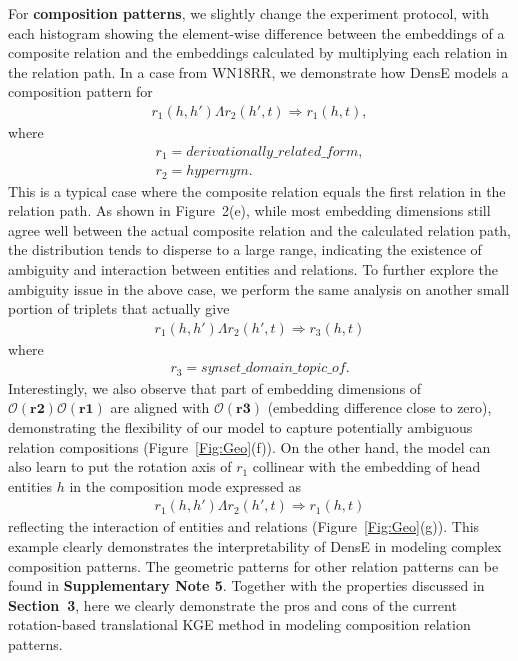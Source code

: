\documentclass[11pt]{article}
\begin{document}
For \textbf{composition patterns}, we slightly change the experiment protocol, with each histogram showing the element-wise difference between the embeddings of a composite relation and the embeddings calculated by multiplying each relation in the relation path. In a case from WN18RR, we demonstrate how DensE models a composition pattern for
\begin{align*}
r_1(h, h') \Lambda r_2(h', t) \Rightarrow r_1(h, t), 
\end{align*}
\noindent where
\begin{gather*}
r_1 = derivationally\_{related}\_{form},\\
r_2 = hypernym.
\end{gather*}
This is a typical case where the composite relation equals the first relation in the relation path. As shown in Figure~2(e), while most embedding dimensions still agree well between the actual composite relation and the calculated relation path, the distribution tends to disperse to a large range, indicating the existence of ambiguity and interaction between entities and relations. To further explore the ambiguity issue in the above case, we perform the same analysis on another small portion of triplets that actually give
\begin{align*}
r_1(h, h') \Lambda r_2(h', t) \Rightarrow r_3(h, t)
\end{align*}
\noindent where
\begin{align*}
r_3 = synset\_domain\_topic\_of.
\end{align*}
Interestingly, we also observe that part of embedding dimensions of \(\mathcal{O}(\textbf{r2})\mathcal{O}(\textbf{r1})\) are aligned with \(\mathcal{O}(\textbf{r3})\) (embedding difference close to zero), demonstrating the flexibility of our model to capture potentially ambiguous relation compositions (Figure~\ref{Fig:Geo}(f)). On the other hand, the model can also learn to put the rotation axis of \(r_1\) collinear with the embedding of head entities \(h\) in the composition mode expressed as
\begin{align*}
r_1(h, h') \Lambda r_2(h', t) \Rightarrow r_1(h, t)
\end{align*}
\noindent reflecting the interaction of entities and relations (Figure~\ref{Fig:Geo}(g)). This example clearly demonstrates the interpretability of DensE in modeling complex composition patterns. The geometric patterns for other relation patterns can be found in \textbf{Supplementary Note 5}. Together with the properties discussed in \textbf{Section~3}, here we clearly demonstrate the pros and cons of the current rotation-based translational KGE method in modeling composition relation patterns.
\end{document}
